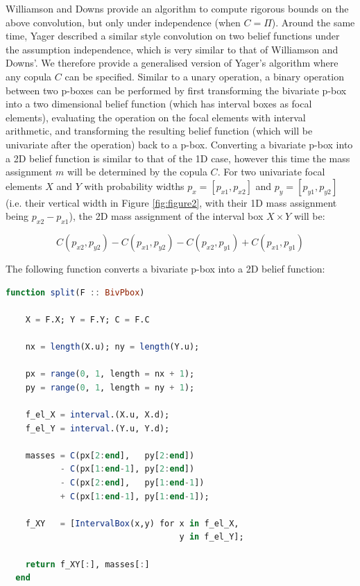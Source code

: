 \documentclass{juliacon}
\begin{document}
Williamson and Downs provide an algorithm to compute rigorous bounds on the above convolution, but only under independence (when $C = \Pi$). Around the same time, Yager \cite{yager1986arithmetic} described a similar style convolution on two belief functions under the assumption independence, which is very similar to that of Williamson and Downs'. We therefore provide a generalised version of Yager's algorithm where any copula $C$ can be specified. Similar to a unary operation, a binary operation between two p-boxes can be performed by first transforming the bivariate p-box into a two dimensional belief function (which has interval boxes as focal elements), evaluating the operation on the focal elements with interval arithmetic, and transforming the resulting belief function (which will be univariate after the operation) back to a p-box. Converting a bivariate p-box into a 2D belief function is similar to that of the 1D case, however this time the mass assignment $m$ will be determined by the copula $C$. For two univariate focal elements $X$ and $Y$ with probability widths $p_{x} = [p_{x1}, p_{x2}]$ and $p_{y} = [p_{y1}, p_{y2}]$ (i.e. their vertical width in Figure \ref{fig:figure2}, with their 1D mass assignment being $p_{x2} - p_{x1}$), the 2D mass assignment of the interval box $X \times Y$ will be: 

\begin{equation*}
  C(p_{x2}, p_{y2}) - C(p_{x1}, p_{y2}) - C(p_{x2}, p_{y1}) + C(p_{x1}, p_{y1})
\end{equation*}

The following function converts a bivariate p-box into a 2D belief function: 

\begin{lstlisting}[language = Julia]
  function split(F :: BivPbox)

    X = F.X; Y = F.Y; C = F.C
    
    nx = length(X.u); ny = length(Y.u);

    px = range(0, 1, length = nx + 1);
    py = range(0, 1, length = ny + 1);

    f_el_X = interval.(X.u, X.d);
    f_el_Y = interval.(Y.u, Y.d);
    
    masses = C(px[2:end],   py[2:end]) 
           - C(px[1:end-1], py[2:end]) 
           - C(px[2:end],   py[1:end-1]) 
           + C(px[1:end-1], py[1:end-1]);

    f_XY   = [IntervalBox(x,y) for x in f_el_X, 
                                   y in f_el_Y];

    return f_XY[:], masses[:]
  end
\end{lstlisting}
\end{document}
